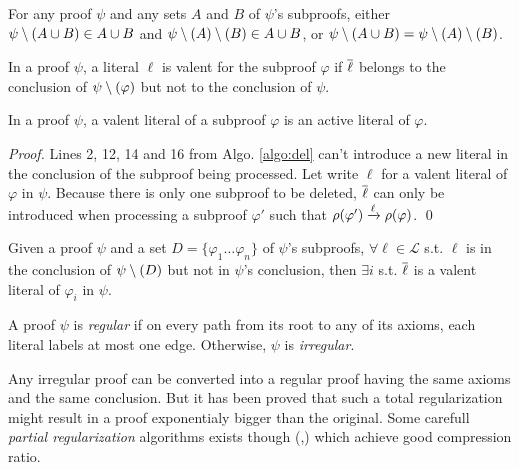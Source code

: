 \documentclass{llncs}
\begin{document}
\begin{proposition} \label{prop:del_assoc}
For any proof $\psi$ and any sets $A$ and $B$ of $\psi$'s subproofs,
either $\psi \setminus (A \cup B)  \in A \cup B$
and    $\psi \setminus (A) \setminus (B) \in A \cup B$,
or     $\psi \setminus (A \cup B) = \psi \setminus (A) \setminus (B)$.
\end{proposition}


\begin{definition}
In a proof $\psi$, a literal $\ell$ is valent for the subproof $\varphi$ if $\overline{\ell}$ belongs to
the conclusion of $\psi \setminus (\varphi)$ but not to the conclusion of $\psi$.
\end{definition}

\begin{proposition} \label{prop:valentactive}
In a proof $\psi$, a valent literal of a subproof $\varphi$ is an active literal of $\varphi$.
\end{proposition}

\begin{proof}
Lines 2, 12, 14 and 16 from Algo. \ref{algo:del} can't introduce a new literal in the conclusion of
the subproof being processed. Let write $\ell$ for a valent literal of $\varphi$ in $\psi$. Because
there is only one subproof to be deleted, $\overline{\ell}$ can only be introduced when processing a
subproof $\varphi'$ such that $\rho(\varphi') \xrightarrow{\ell} \rho(\varphi)$. \qed
\end{proof}

\begin{proposition}
Given a proof $\psi$ and a set $D = \{\varphi_1 \ldots \varphi_n\}$ of $\psi$'s subproofs, $\forall
\ell \in \mathcal{L}$ s.t. $\ell$ is in the conclusion of $\psi \setminus (D)$ but not in $\psi$'s
conclusion, then $\exists i$ s.t. $\overline{\ell}$ is a valent literal of $\varphi_i$ in $\psi$.
\end{proposition}

\begin{definition}
A proof $\psi$ is \emph{regular} if on every path from its root to any of its axioms, each literal
labels at most one edge. Otherwise, $\psi$ is \emph{irregular}.
\end{definition}

Any irregular proof can be converted into a regular proof having the same axioms and the same
conclusion. But it has been proved \cite{Tseitin} that such a total regularization might result in a
proof exponentialy bigger than the original. Some carefull \emph{partial regularization} algorithms
exists though (\cite{RP08},\cite{LURPI}) which achieve good compression ratio.
\end{document}
